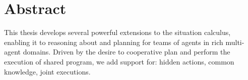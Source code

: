 
\chapter*{Abstract}

This thesis develops several powerful extensions to the situation calculus,
enabling it to reasoning about and planning for teams of agents in rich 
multi-agent domains.  Driven by the desire to cooperative plan and perform
the execution of shared program, we add support for: hidden actions, common knowledge, joint executions.


